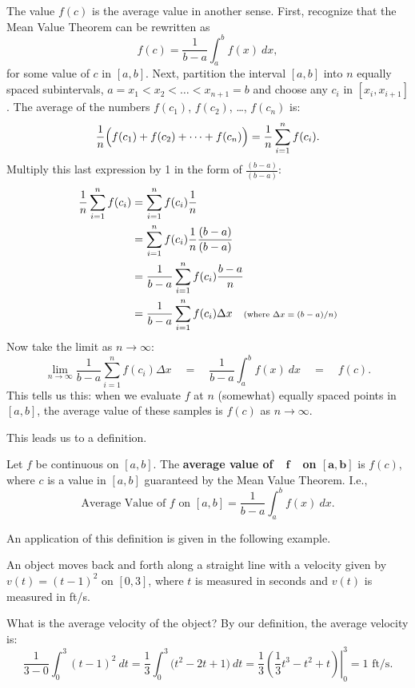 The value $f(c)$ is the average value in another sense. First, recognize that the Mean Value Theorem can be rewritten as
\[f(c) = \frac{1}{b-a}\int_a^b f(x)\ dx,\]
for some value of $c$ in $[a,b]$. Next, partition the interval $[a,b]$ into $n$ equally spaced subintervals, $a=x_1 < x_2 < \dots < x_{n+1}=b$ and choose any $c_i$ in $[x_i,x_{i+1}]$. The average of the numbers $f(c_1)$, $f(c_2)$, \dots, $f(c_n)$ is:
\[\frac1n\Bigl(f(c_1) + f(c_2) + \dots + f(c_n)\Bigr) = \frac1n\sum_{i=1}^n f(c_i).\]
Multiply this last expression by 1 in the form of $\frac{(b-a)}{(b-a)}$:
\begin{align*}
	\frac1n\sum_{i=1}^n f(c_i)
	&= \sum_{i=1}^n f(c_i)\frac1n \\
	&= \sum_{i=1}^n f(c_i)\frac1n \frac{(b-a)}{(b-a)} \\
	&= \frac{1}{b-a} \sum_{i=1}^n f(c_i)\frac{b-a}n  \\
	&=\frac{1}{b-a} \sum_{i=1}^n f(c_i)\Delta x
	\quad \text{\scriptsize (where $\Delta x = (b-a)/n$)} %
\end{align*}
Now take the limit as $n\to\infty$:
\[
 \lim_{n\to\infty} \frac{1}{b-a} \sum_{i=1}^n f(c_i)\Delta x\quad
 = \quad \frac{1}{b-a} \int_a^b f(x)\ dx\quad = \quad  f(c).
\]
This tells us this: when we evaluate $f$ at $n$ (somewhat) equally spaced points in $[a,b]$, the average value of these samples is $f(c)$ as $n\to\infty$.

This leads us to a definition.

\begin{definition}\label{def:av_val}
Let $f$ be continuous on $[a,b]$. The \textbf{average value of\ \ $\mathbf{f}$\ \ on $\mathbf{[a,b]}$} is $f(c)$, where $c$ is a value in $[a,b]$ guaranteed by the Mean Value Theorem. I.e., 
\[\text{Average Value of $f$ on $[a,b]$} = \frac{1}{b-a}\int_a^b f(x)\ dx.\]
\end{definition}

An application of this definition is given in the following example.

\begin{example}\label{ex_ftc10}
An object moves back and forth along a straight line with a velocity given by $v(t) = (t-1)^2$ on $[0,3]$, where $t$ is measured in seconds and $v(t)$ is measured in ft/s. 

What is the average velocity of the object?
\solution
By our definition, the average velocity is:
\[
\frac1{3-0}\int_0^3 (t-1)^2\ dt
= \frac13 \int_0^3 \bigl(t^2-2t+1\bigr)\ dt
= \left.\frac13\left(\frac13t^3-t^2+t\right)\right|_0^3
= 1\text{ ft/s}.
\]
\end{example}

